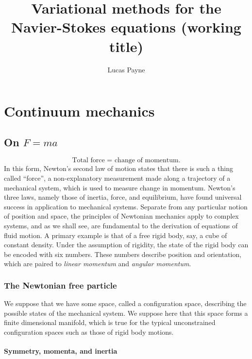 \documentclass[11pt,a4paper]{memoir}
\title{Variational methods for the Navier-Stokes equations
\scriptsize{(working title)}
}
\author{Lucas Payne}
\begin{document}
\maketitle

\tableofcontents

\chapter{Continuum mechanics}
\section{On $F = ma$} %
\begin{equation}
    \text{Total force = change of momentum}.
\end{equation}
In this form, Newton's second law of motion states that there is such a thing called ``force'',
a non-explanatory measurement made along a trajectory of a mechanical system, which is used to measure change in momentum.
Newton's three laws, namely those of inertia, force, and equilibrium, have found universal success in application
to mechanical systems. Separate from any particular notion of position and space, the principles of Newtonian mechanics
apply to complex systems, and as we shall see, are fundamental to the derivation of equations of fluid motion.
A primary example is that of a free rigid body, say, a cube of constant density. Under the assumption of rigidity,
the state of the rigid body can be encoded with six numbers. These numbers describe position and orientation, which are paired
to \textit{linear momentum} and \textit{angular momentum}.

\subsection{The Newtonian free particle}
We suppose that we have some space, called a configuration space, describing the possible states of the mechanical system. We suppose here
that this space forms a finite dimensional manifold, which is true for the typical unconstrained configuration spaces such as those of rigid
body motions.

\subsubsection{Symmetry, momenta, and inertia}
\end{document}
